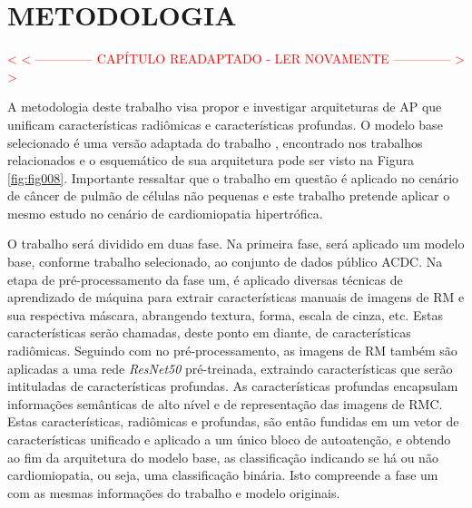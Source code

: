 \chapter{METODOLOGIA} 
\label{chap:metodologia}

\textcolor{red}{
< < -------------- CAPÍTULO READAPTADO - LER NOVAMENTE -------------- > >
}

A metodologia deste trabalho visa propor e investigar arquiteturas de \gls{AP} que unificam características radiômicas e características profundas. O modelo base selecionado é uma versão adaptada do trabalho \cite{aiSelfAttentionBasedFusion2023}, encontrado nos trabalhos relacionados e o esquemático de sua arquitetura pode ser visto na Figura \ref{fig:fig008}. Importante ressaltar que o trabalho em questão é aplicado no cenário de câncer de pulmão de células não pequenas e este trabalho pretende aplicar o mesmo estudo no cenário de cardiomiopatia hipertrófica.

 O trabalho será dividido em duas fase. Na primeira fase, será aplicado um modelo base, conforme trabalho selecionado, ao conjunto de dados público \gls{ACDC}. Na etapa de pré-processamento da fase um, é aplicado diversas técnicas de aprendizado de máquina para extrair características manuais de imagens de RM e sua respectiva máscara, abrangendo textura, forma, escala de cinza, etc. Estas características serão chamadas, deste ponto em diante, de características radiômicas. Seguindo com no pré-processamento, as imagens de RM também são aplicadas a uma rede \textit{ResNet50} pré-treinada, extraindo características que serão intituladas de características profundas. As características profundas encapsulam informações semânticas de alto nível e de representação das imagens de \gls{RMC}. Estas características, radiômicas e profundas, são então fundidas em um vetor de características unificado e aplicado a um único bloco de autoatenção, e obtendo ao fim da arquitetura do modelo base, as classificação indicando se há ou não cardiomiopatia, ou seja, uma classificação binária. Isto compreende a fase um com as mesmas informações do trabalho e modelo originais.

